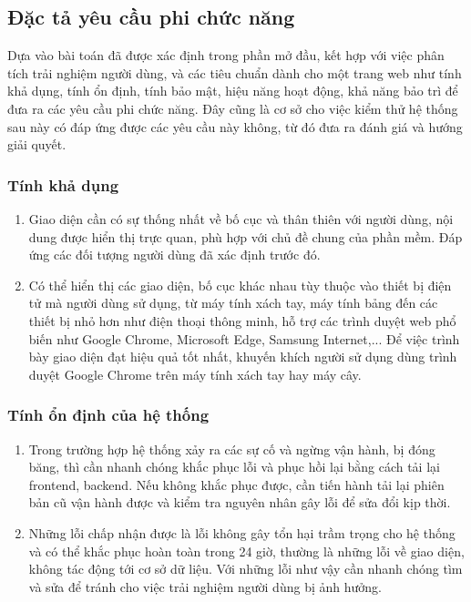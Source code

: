 \documentclass[./../main.tex]{subfiles}
\begin{document}
\subsection{Đặc tả yêu cầu phi chức năng}
Dựa vào bài toán đã được xác định trong phần mở đầu, kết hợp với việc phân tích trải nghiệm người dùng, và các tiêu chuẩn dành cho một trang web như tính khả dụng, tính ổn định, tính bảo mật, hiệu năng hoạt động, khả năng bảo trì để đưa ra các yêu cầu phi chức năng. Đây cũng là cơ sở cho việc kiểm thử hệ thống sau này có đáp ứng được các yêu cầu này không, từ đó đưa ra đánh giá và hướng giải quyết.

\subsubsection{Tính khả dụng}
\begin{enumerate}
    \item Giao diện cần có sự thống nhất về bố cục và thân thiên với người dùng, nội dung được hiển thị trực quan, phù hợp với chủ đề chung của phần mềm. Đáp ứng các đối tượng người dùng đã xác định trước đó.
    \item Có thể hiển thị các giao diện, bố cục khác nhau tùy thuộc vào thiết bị điện tử mà người dùng sử dụng, từ máy tính xách tay, máy tính bảng đến các thiết bị nhỏ hơn như điện thoại thông minh, hỗ trợ các trình duyệt web phổ biến như Google Chrome, Microsoft Edge, Samsung Internet,... Để việc trình bày giao diện đạt hiệu quả tốt nhất, khuyến khích người sử dụng dùng trình duyệt Google Chrome trên máy tính xách tay hay máy cây.
\end{enumerate}

\subsubsection{Tính ổn định của hệ thống}
\begin{enumerate}
    \item Trong trường hợp hệ thống xảy ra các sự cố và ngừng vận hành, bị đóng băng, thì cần nhanh chóng khắc phục lỗi và phục hồi lại bằng cách tải lại frontend, backend. Nếu không khắc phục được, cần tiến hành tải lại phiên bản cũ vận hành được và kiểm tra nguyên nhân gây lỗi để sửa đổi kịp thời.
    \item Những lỗi chấp nhận được là lỗi không gây tổn hại trầm trọng cho hệ thống và có thể khắc phục hoàn toàn trong 24 giờ, thường là những lỗi về giao diện, không tác động tới cơ sở dữ liệu. Với những lỗi như vậy cần nhanh chóng tìm và sửa để tránh cho việc trải nghiệm người dùng bị ảnh hưởng.
\end{enumerate}
\end{document}
